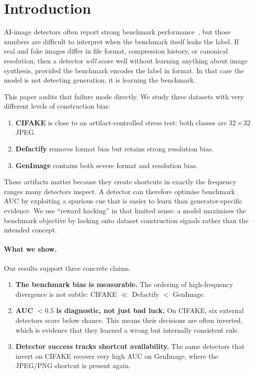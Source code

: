 \documentclass{bmvc2k}
\begin{document}
\section{Introduction}
\label{sec:intro}

AI-image detectors often report strong benchmark performance~\cite{wang2020cnn,corvi2023intriguing,ricker2024aeroblade}, but those numbers are difficult to interpret when the benchmark itself leaks the label. If real and fake images differ in file format, compression history, or canonical resolution, then a detector \emph{will} score well without learning anything about image synthesis, provided the benchmark encodes the label in format. In that case the model is not detecting generation; it is learning the benchmark.

This paper audits that failure mode directly. We study three datasets with very different levels of construction bias:
\begin{enumerate}
  \item \textbf{CIFAKE} is close to an artifact-controlled stress test: both classes are $32\times32$ JPEG.
  \item \textbf{Defactify} removes format bias but retains strong resolution bias.
  \item \textbf{GenImage} contains both severe format and resolution bias.
\end{enumerate}
These artifacts matter because they create shortcuts in exactly the frequency ranges many detectors inspect. A detector can therefore optimise benchmark AUC by exploiting a spurious cue that is easier to learn than generator-specific evidence. We use ``reward hacking'' in that limited sense: a model maximises the benchmark objective by locking onto dataset construction signals rather than the intended concept.

\paragraph{What we show.}
Our results support three concrete claims.
\begin{enumerate}
  \item \textbf{The benchmark bias is measurable.} The ordering of high-frequency divergence is not subtle: CIFAKE $\ll$ Defactify $<$ GenImage.
  \item \textbf{AUC $< 0.5$ is diagnostic, not just bad luck.} On CIFAKE, six external detectors score below chance. This means their decisions are often inverted, which is evidence that they learned a wrong but internally consistent rule.
  \item \textbf{Detector success tracks shortcut availability.} The same detectors that invert on CIFAKE recover very high AUC on GenImage, where the JPEG/PNG shortcut is present again.
\end{enumerate}
\end{document}
